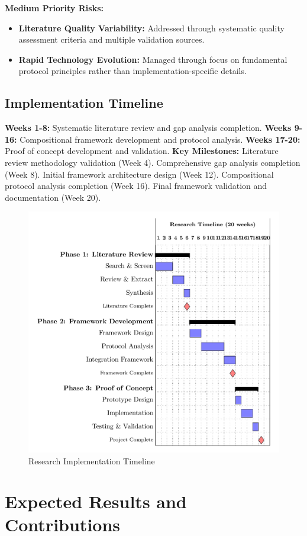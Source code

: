 \documentclass[12pt,a4paper]{article}
\begin{document}
\noindent \textbf{Medium Priority Risks:}
\begin{itemize}
\item \textbf{Literature Quality Variability:} Addressed through systematic quality assessment criteria and multiple validation sources.
\item \textbf{Rapid Technology Evolution:} Managed through focus on fundamental protocol principles rather than implementation-specific details.
\end{itemize}

\subsection{Implementation Timeline}

\textbf{Weeks 1-8:} Systematic literature review and gap analysis completion.
\textbf{Weeks 9-16:} Compositional framework development and protocol analysis.
\textbf{Weeks 17-20:} Proof of concept development and validation.
\textbf{Key Milestones:} Literature review methodology validation (Week 4). Comprehensive gap analysis completion (Week 8). Initial framework architecture design (Week 12). Compositional protocol analysis completion (Week 16). Final framework validation and documentation (Week 20).

\begin{figure}[h!]
    \centering
    \includegraphics[width=.75\linewidth]{timeline-gantt-simple-1.png}
    \caption{Research Implementation Timeline}
    \label{fig:timeline}
\end{figure}

\section{Expected Results and Contributions}
\label{sec:results}
\end{document}
